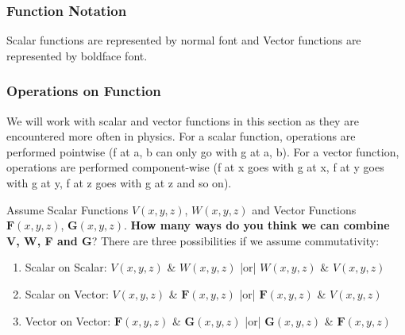 \subsubsection{Function Notation}

Scalar functions are represented by normal font and Vector functions are
represented by boldface font.

\subsubsection{Operations on Function}

We will work with scalar and vector functions in this section as they
are encountered more often in physics. For a scalar function, operations
are performed pointwise (f at a, b can only go with g at a, b). For a
vector function, operations are performed component-wise (f at x goes
with g at x, f at y goes with g at y, f at z goes with g at z and so on).

Assume Scalar Functions \( V(x, y, z) \), \( W(x, y, z) \) and Vector
Functions \( \mathbf{F}(x, y, z) \), \( \mathbf{G}(x, y, z) \).
\textbf{How many ways do you think we can combine V, W, F and G}? There
are three possibilities if we assume commutativity:
\begin{enumerate}
  \item Scalar on Scalar: \( V(x, y, z) \) \& \( W(x, y, z) \) |or| \( W(x, y, z) \) \& \( V(x, y, z) \)
  \item Scalar on Vector: \( V(x, y, z) \) \& \( \mathbf{F}(x, y, z) \) |or| \( \mathbf{F}(x, y, z) \) \& \( V(x, y, z) \)
  \item Vector on Vector: \( \mathbf{F}(x, y, z) \) \& \( \mathbf{G}(x, y, z) \) |or| \( \mathbf{G}(x, y, z) \) \& \( \mathbf{F}(x, y, z) \)
\end{enumerate}

